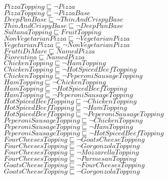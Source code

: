 \documentclass[a4paper,10pt]{article}
\begin{document}
 $PizzaTopping \sqsubseteq  \lnot Pizza$\\ 
 $PizzaTopping \sqsubseteq  \lnot PizzaBase$\\ 
 $DeepPanBase \sqsubseteq  \lnot ThinAndCrispyBase$\\ 
 $ThinAndCrispyBase \sqsubseteq  \lnot DeepPanBase$\\ 
 $SultanaTopping \sqsubseteq FruitTopping$\\ 
 $NonVegetarianPizza \sqsubseteq  \lnot VegetarianPizza$\\ 
 $VegetarianPizza \sqsubseteq  \lnot NonVegetarianPizza$\\ 
 $FruttiDiMare \sqsubseteq NamedPizza$\\ 
 $Fiorentina \sqsubseteq NamedPizza$\\ 
 $ChickenTopping \sqsubseteq  \lnot HamTopping$\\ 
 $ChickenTopping \sqsubseteq  \lnot HotSpicedBeefTopping$\\ 
 $ChickenTopping \sqsubseteq  \lnot PeperoniSausageTopping$\\ 
 $HamTopping \sqsubseteq  \lnot ChickenTopping$\\ 
 $HamTopping \sqsubseteq  \lnot HotSpicedBeefTopping$\\ 
 $HamTopping \sqsubseteq  \lnot PeperoniSausageTopping$\\ 
 $HotSpicedBeefTopping \sqsubseteq  \lnot ChickenTopping$\\ 
 $HotSpicedBeefTopping \sqsubseteq  \lnot HamTopping$\\ 
 $HotSpicedBeefTopping \sqsubseteq  \lnot PeperoniSausageTopping$\\ 
 $PeperoniSausageTopping \sqsubseteq  \lnot ChickenTopping$\\ 
 $PeperoniSausageTopping \sqsubseteq  \lnot HamTopping$\\ 
 $PeperoniSausageTopping \sqsubseteq  \lnot HotSpicedBeefTopping$\\ 
 $FourCheesesTopping \sqsubseteq  \lnot GoatsCheeseTopping$\\ 
 $FourCheesesTopping \sqsubseteq  \lnot GorgonzolaTopping$\\ 
 $FourCheesesTopping \sqsubseteq  \lnot MozzarellaTopping$\\ 
 $FourCheesesTopping \sqsubseteq  \lnot ParmesanTopping$\\ 
 $GoatsCheeseTopping \sqsubseteq  \lnot FourCheesesTopping$\\ 
 $GoatsCheeseTopping \sqsubseteq  \lnot GorgonzolaTopping$\\ 
\end{document}

